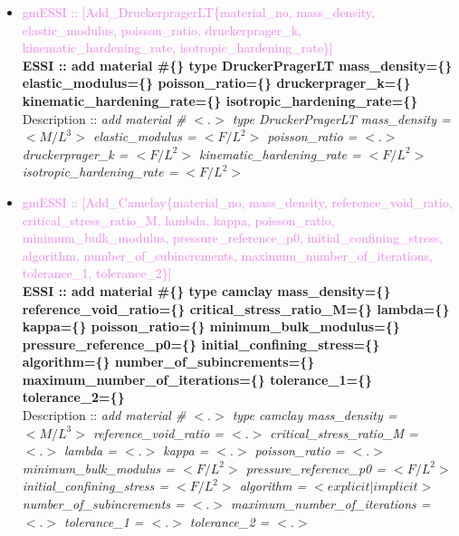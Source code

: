 \documentclass[11pt]{article}
\begin{document}
\begin{itemize}
      \item \textcolor{violet}{gmESSI :: [Add\_DruckerpragerLT\{material\_no, mass\_density, elastic\_modulus, poisson\_ratio, druckerprager\_k, kinematic\_hardening\_rate, isotropic\_hardening\_rate\}]}\\
      \textbf{ESSI :: add material \#\{\} type DruckerPragerLT mass\_density=\{\} elastic\_modulus=\{\}  poisson\_ratio=\{\} druckerprager\_k=\{\} kinematic\_hardening\_rate=\{\} isotropic\_hardening\_rate=\{\}}\\
      Description ::  \textit{ add material \# $<.>$ type DruckerPragerLT  mass\_density = $<M/L^3>$ elastic\_modulus = $<F/L^2>$  poisson\_ratio = $<.>$ druckerprager\_k = $<F/L^2>$ kinematic\_hardening\_rate = $<F/L^2>$ isotropic\_hardening\_rate = $<F/L^2>$} 

      \item \textcolor{violet}{gmESSI :: [Add\_Camclay\{material\_no, mass\_density, reference\_void\_ratio, critical\_stress\_ratio\_M, lambda, kappa, poisson\_ratio, minimum\_bulk\_modulus, pressure\_reference\_p0, initial\_confining\_stress, algorithm, number\_of\_subincrements, maximum\_number\_of\_iterations, tolerance\_1, tolerance\_2\}]}\\
      \textbf{ESSI :: add material \#\{\} type camclay mass\_density=\{\} reference\_void\_ratio=\{\} critical\_stress\_ratio\_M=\{\} lambda=\{\} kappa=\{\} poisson\_ratio=\{\} minimum\_bulk\_modulus=\{\} pressure\_reference\_p0=\{\} initial\_confining\_stress=\{\} algorithm=\{\} number\_of\_subincrements=\{\} maximum\_number\_of\_iterations=\{\} tolerance\_1=\{\} tolerance\_2=\{\} }\\
      Description ::  \textit{ add material \# $<.>$ type camclay mass\_density = $<M/L^3>$ reference\_void\_ratio = $<.>$ critical\_stress\_ratio\_M = $<.>$ lambda = $<.>$ kappa = $<.>$ poisson\_ratio = $<.>$ minimum\_bulk\_modulus = $<F/L^2>$ pressure\_reference\_p0 = $<F/L^2>$ initial\_confining\_stress = $<F/L^2>$ algorithm = $<explicit|implicit>$  number\_of\_subincrements = $<.>$ maximum\_number\_of\_iterations = $<.>$ tolerance\_1 = $<.>$ tolerance\_2 = $<.>$} 


\end{itemize}
\end{document}
